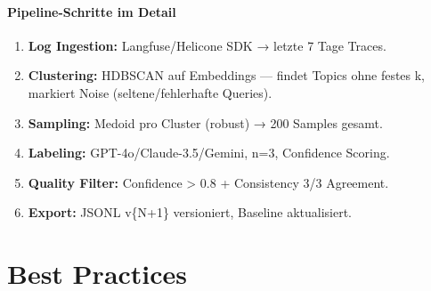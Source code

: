 \paragraph{Pipeline-Schritte im Detail}
\begin{enumerate}
    \item \textbf{Log Ingestion:} Langfuse/Helicone SDK → letzte 7 Tage Traces.
    \item \textbf{Clustering:} HDBSCAN auf Embeddings — findet Topics ohne festes k, markiert Noise (seltene/fehlerhafte Queries).
    \item \textbf{Sampling:} Medoid pro Cluster (robust) → 200 Samples gesamt.
    \item \textbf{Labeling:} GPT-4o/Claude-3.5/Gemini, n=3, Confidence Scoring.
    \item \textbf{Quality Filter:} Confidence > 0.8 + Consistency 3/3 Agreement.
    \item \textbf{Export:} JSONL v\{N+1\} versioniert, Baseline aktualisiert.
\end{enumerate}


\section{Best Practices}

